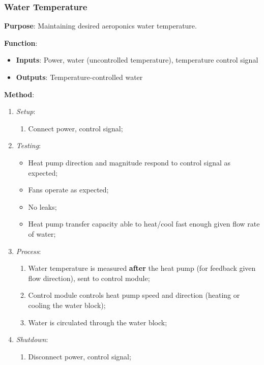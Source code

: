 \documentclass{../tex/report}
\begin{document}
\newpage

\subsubsection{Water Temperature}
\label{sec:watertemp}

\textbf{Purpose}: Maintaining desired aeroponics water temperature.

\textbf{Function}: 
\begin{itemize}
    \item \textbf{Inputs}: Power, water (uncontrolled temperature), temperature control signal
    \item \textbf{Outputs}: Temperature-controlled water
\end{itemize}

\textbf{Method}:
\begin{enumerate}
    \item \textit{Setup}:
    \begin{enumerate}
        \item Connect power, control signal;
    \end{enumerate}
    \item \textit{Testing}:
    \begin{itemize}
        \item Heat pump direction and magnitude respond to control signal as expected;
        \item Fans operate as expected;
        \item No leaks;
        \item Heat pump transfer capacity able to heat/cool fast enough given flow rate of water;
    \end{itemize}
    \item \textit{Process}:
    \begin{enumerate}
        \item Water temperature is measured \textbf{after} the heat pump (for feedback given flow direction), sent to control module;
        \item Control module controls heat pump speed and direction (heating or cooling the water block);
        \item Water is circulated through the water block;
    \end{enumerate}
    \item \textit{Shutdown}:
    \begin{enumerate}
        \item Disconnect power, control signal;
    \end{enumerate}
\end{enumerate}
\end{document}
